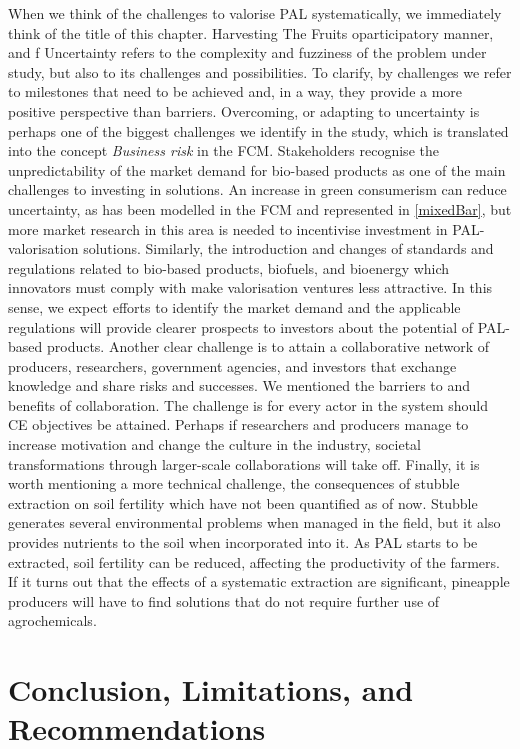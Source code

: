 When we think of the challenges to valorise PAL systematically, we immediately think of the title of this chapter. Harvesting The Fruits oparticipatory manner, and f Uncertainty refers to the complexity and fuzziness of the problem under study, but also to its challenges and possibilities. To clarify, by challenges we refer to milestones that need to be achieved and, in a way, they provide a more positive perspective than barriers. Overcoming, or adapting to uncertainty is perhaps one of the biggest challenges we identify in the study, which is translated into the concept \textit{Business risk} in the FCM. Stakeholders recognise the unpredictability of the market demand for bio-based products as one of the main challenges to investing in solutions. An increase in green consumerism can reduce uncertainty, as has been modelled in the FCM and represented in \cref{mixedBar}, but more market research in this area is needed to incentivise investment in PAL-valorisation solutions. Similarly, the introduction and changes of standards and regulations related to bio-based products, biofuels, and bioenergy which innovators must comply with make valorisation ventures less attractive. In this sense, we expect efforts to identify the market demand and the applicable regulations will provide clearer prospects to investors about the potential of PAL-based products. Another clear challenge is to attain a collaborative network of producers, researchers, government agencies, and investors that exchange knowledge and share risks and successes. We mentioned the barriers to and benefits of collaboration. The challenge is for every actor in the system should CE objectives be attained. Perhaps if researchers and producers manage to increase motivation and change the culture in the industry, societal transformations through larger-scale collaborations will take off. Finally, it is worth mentioning a more technical challenge, the consequences of stubble extraction on soil fertility which have not been quantified as of now. Stubble generates several environmental problems when managed in the field, but it also provides nutrients to the soil when incorporated into it. As PAL starts to be extracted, soil fertility can be reduced, affecting the productivity of the farmers. If it turns out that the effects of a systematic extraction are significant, pineapple producers will have to find solutions that do not require further use of agrochemicals. 

\section{Conclusion, Limitations, and Recommendations}

